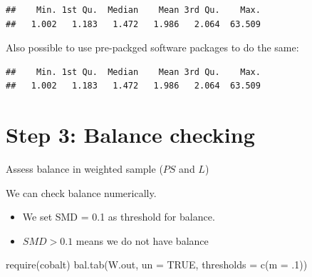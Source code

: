 \documentclass[
]{book}
\newenvironment{Shaded}{\begin{snugshade}}{\end{snugshade}}
\newcommand{\AttributeTok}[1]{\textcolor[rgb]{0.77,0.63,0.00}{#1}}
\newcommand{\ConstantTok}[1]{\textcolor[rgb]{0.00,0.00,0.00}{#1}}
\newcommand{\DecValTok}[1]{\textcolor[rgb]{0.00,0.00,0.81}{#1}}
\newcommand{\FunctionTok}[1]{\textcolor[rgb]{0.00,0.00,0.00}{#1}}
\newcommand{\NormalTok}[1]{#1}
\newcommand{\OtherTok}[1]{\textcolor[rgb]{0.56,0.35,0.01}{#1}}
\newcommand{\SpecialCharTok}[1]{\textcolor[rgb]{0.00,0.00,0.00}{#1}}
\newcommand{\StringTok}[1]{\textcolor[rgb]{0.31,0.60,0.02}{#1}}
\providecommand{\tightlist}{%
  \setlength{\itemsep}{0pt}\setlength{\parskip}{0pt}}
\begin{document}
\begin{verbatim}
##    Min. 1st Qu.  Median    Mean 3rd Qu.    Max. 
##   1.002   1.183   1.472   1.986   2.064  63.509
\end{verbatim}

Also possible to use pre-packged software packages to do the same:

\begin{Shaded}
\end{Shaded}

\begin{verbatim}
##    Min. 1st Qu.  Median    Mean 3rd Qu.    Max. 
##   1.002   1.183   1.472   1.986   2.064  63.509
\end{verbatim}

\hypertarget{step-3-balance-checking}{%
\section{Step 3: Balance checking}\label{step-3-balance-checking}}

\begin{rmdcomment}
Assess balance in weighted sample (\(PS\) and \(L\))
\end{rmdcomment}

We can check balance numerically.

\begin{itemize}
\tightlist
\item
  We set SMD = 0.1 as threshold for balance.
\item
  \(SMD \gt 0.1\) means we do not have balance
\end{itemize}

\begin{Shaded}
\begin{Highlighting}[]
\FunctionTok{require}\NormalTok{(cobalt)}
\FunctionTok{bal.tab}\NormalTok{(W.out, }\AttributeTok{un =} \ConstantTok{TRUE}\NormalTok{, }
        \AttributeTok{thresholds =} \FunctionTok{c}\NormalTok{(}\AttributeTok{m =}\NormalTok{ .}\DecValTok{1}\NormalTok{))}
\end{Highlighting}
\end{Shaded}
\end{document}
